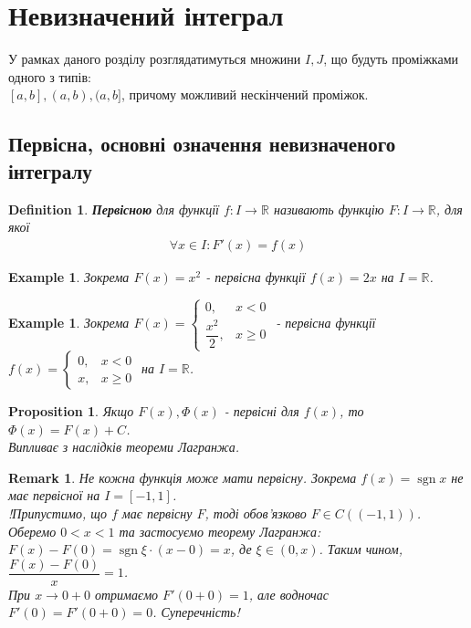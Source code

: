 \documentclass[a4paper, 10pt]{article}
\DeclareMathOperator\sign{sgn}
\theoremstyle{theoremdd}
\theoremstyle{theoremdd}
\theoremstyle{theoremdd}
\newtheorem{definition}[theorem]{Definition}
\theoremstyle{theoremdd}
\theoremstyle{theoremdd}
\newtheorem{example}[theorem]{Example}
\theoremstyle{theoremdd}
\newtheorem{proposition}[theorem]{Proposition}
\theoremstyle{theoremdd}
\newtheorem{remark}[theorem]{Remark}
\theoremstyle{theoremdd}
\theoremstyle{theoremdd}
\begin{document}

\tableofcontents
\newpage
\section{Невизначений інтеграл}
У рамках даного розділу розглядатимуться множини $I,J$, що будуть проміжками одного з типів:\\
$[a,b], (a,b), (a,b]$, причому можливий нескінчений проміжок.
\subsection{Первісна, основні означення невизначеного інтегралу}

\begin{definition}
\textbf{Первісною} для функції $f: I \to \mathbb{R}$ називають функцію $F: I \to \mathbb{R}$, для якої
\begin{align*}
\forall x \in I: F'(x) = f(x)
\end{align*}
\end{definition}

\begin{example}
Зокрема $F(x) = x^2$ - первісна функції $f(x) = 2x$ на $I = \mathbb{R}$.
\end{example}

\begin{example}
Зокрема $F(x) = \begin{cases} 0, & x < 0 \\ \dfrac{x^2}{2}, & x \geq 0\end{cases}$ - первісна функції $f(x) = \begin{cases} 0, & x < 0 \\ x, & x \geq 0 \end{cases}$ на $I = \mathbb{R}$.
\end{example}

\begin{proposition}
Якщо $F(x), \Phi(x)$ - первісні для $f(x)$, то $\Phi(x) = F(x) + C$.\\
\textit{Випливає з наслідків теореми Лагранжа.}
\end{proposition}

\begin{remark}
Не кожна функція може мати первісну. Зокрема $f(x) = \sign x$ не має первісної на $I = [-1,1]$.\\
!Припустимо, що $f$ має первісну $F$, тоді обов'язково $F \in C((-1,1))$. Оберемо $0 < x < 1$ та застосуємо теорему Лагранжа:\\
$F(x) - F(0) = \sign \xi \cdot (x - 0) = x$, де $\xi \in (0,x)$. Таким чином, $\dfrac{F(x)-F(0)}{x} = 1$.\\
При $x \to 0+0$ отримаємо $F'(0+0) = 1$, але водночас $F'(0) = F'(0+0) = 0$. Суперечність!
\end{remark}
\end{document}
